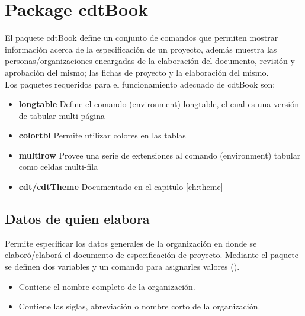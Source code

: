 \chapter{Package cdtBook}
\label{cg:book}

    El paquete cdtBook define un conjunto de comandos que permiten mostrar información acerca de la especificación de un proyecto, además muestra las personas/organizaciones encargadas de la elaboración del documento, revisión y aprobación del mismo; las fichas de proyecto y la elaboración del mismo.\\
    
\noindent Los paquetes requeridos para el funcionamiento adecuado de cdtBook son:
        
    \begin{itemize}
        \item {\bf longtable} Define el comando (environment) longtable, el cual es una versión de tabular multi-página
        \item {\bf colortbl} Permite utilizar colores en las tablas
        \item {\bf multirow} Provee una serie de extensiones al comando (environment) tabular como celdas multi-fila
        \item {\bf cdt/cdtTheme} Documentado en el capitulo \ref{ch:theme}
    \end{itemize}
    
\section{Datos de quien elabora}
    
    Permite especificar los datos generales de la organización en donde se elaboró/elaborá el documento de especificación de proyecto. Mediante el paquete se definen dos variables y un comando para asignarles valores ().
    
\hypertarget{varOrganizacion}{}
\hypertarget{varCveOrganizacion}{}

    \begin{itemize}
        \item {\bf{}} Contiene el nombre completo de la organización.
        \item {\bf{}} Contiene las siglas, abreviación o nombre corto de la organización.
    \end{itemize}
    
